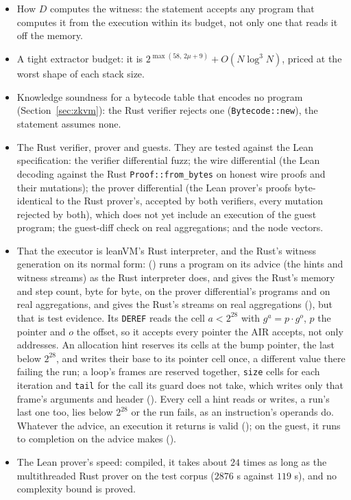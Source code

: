 \documentclass[11pt]{article}
\begin{document}
\begin{itemize}
\item How $D$ computes the witness: the statement accepts any program that computes it from the
execution within its budget, not only one that reads it off the memory.
\item A tight extractor budget: it is $2^{\max(58,\,2\mu + 9)} + O(N\log^3 N)$, priced at the worst shape of each stack size.
\item Knowledge soundness for a bytecode table that encodes no program (Section~\ref{sec:zkvm}): the Rust verifier rejects one (\texttt{Bytecode::new}), the statement assumes none.
\item The Rust verifier, prover and guests. They are tested against the Lean specification: the
verifier differential fuzz; the wire differential (the Lean decoding against the Rust
\texttt{Proof::from\_bytes} on honest wire proofs and their mutations); the prover differential (the Lean prover's proofs byte-identical to the
Rust prover's, accepted by both verifiers, every mutation rejected by both), which does not yet
include an execution of the guest program; the guest-diff check on real aggregations; and the node
vectors.
\item That the executor is leanVM's Rust interpreter, and  the Rust's witness generation on its normal form:  () runs a program on its advice (the hints and witness streams) as the Rust interpreter does, and gives the Rust's memory and step count, byte for byte, on the prover differential's programs and on real aggregations, and  gives the Rust's streams on real aggregations (), but that is test evidence. Its \texttt{DEREF} reads the cell $a < 2^{28}$ with $g^a = p \cdot g^{o}$, $p$ the pointer and $o$ the offset, so it accepts every pointer the AIR accepts, not only addresses. An allocation hint reserves its cells at the bump pointer, the last below $2^{28}$, and writes their base to its pointer cell once, a different value there failing the run; a loop's frames are reserved together, \texttt{size} cells for each iteration and \texttt{tail} for the call its guard does not take, which writes only that frame's arguments and header (). Every cell a hint reads or writes, a run's last one too, lies below $2^{28}$ or the run fails, as an instruction's operands do. Whatever the advice, an execution it returns is valid (); on the guest, it runs to completion on the advice  makes ().
\item The Lean prover's speed: compiled, it takes about $24$ times as long as the multithreaded
Rust prover on the test corpus ($2876$ s against $119$ s), and no complexity bound is proved.
\end{itemize}
\end{document}

